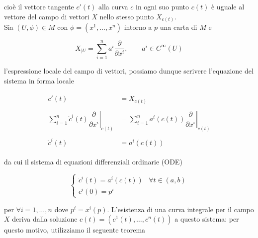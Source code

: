 cioè il vettore tangente $ c'(t) $ alla curva $ c $ in ogni suo punto $ c(t) $ è uguale al vettore del campo di vettori $ X $ nello stesso punto $ X_{c(t)} $.\\
Sia $ (U,\phi) \in M $ con $ \phi = (x^{1},\dots,x^{n}) $ intorno a $ p $ una carta di $ M $ e

\begin{equation}
	X_{|U} = \sum_{i=1}^{n} a^{i} \dfrac{\partial}{\partial x^{i}}, \qquad a^{i} \in C^{\infty}(U)
\end{equation}

l'espressione locale del campo di vettori, possiamo dunque scrivere l'equazione del sistema in forma locale

\begin{align}
	\begin{split}
		c'(t) &= X_{c(t)}\\\\
		\sum_{i=1}^{n} \dot{c}^{i}(t) \left. \dfrac{\partial}{\partial x^{i}} \right|_{c(t)} &= \sum_{i=1}^{n} a^{i}(c(t)) \left. \dfrac{\partial}{\partial x^{i}} \right|_{c(t)}\\\\
		\dot{c}^{i}(t) &= a^{i}(c(t))
	\end{split}
\end{align}

da cui il sistema di equazioni differenziali ordinarie (ODE)

\begin{equation}
	\begin{cases}
		\dot{c}^{i}(t) = a^{i}(c(t)) & \forall t \in (a,b)\\
		c^{i}(0) = p^{i}
	\end{cases}
\end{equation}

per $ \forall i=1,\dots,n $ dove $ p^{i} = x^{i} (p) $. L'esistenza di una curva integrale per il campo $ X $ deriva dalla soluzione $ c(t) = (c^{1}(t),\dots,c^{n}(t)) $ a questo sistema: per questo motivo, utilizziamo il seguente teorema


